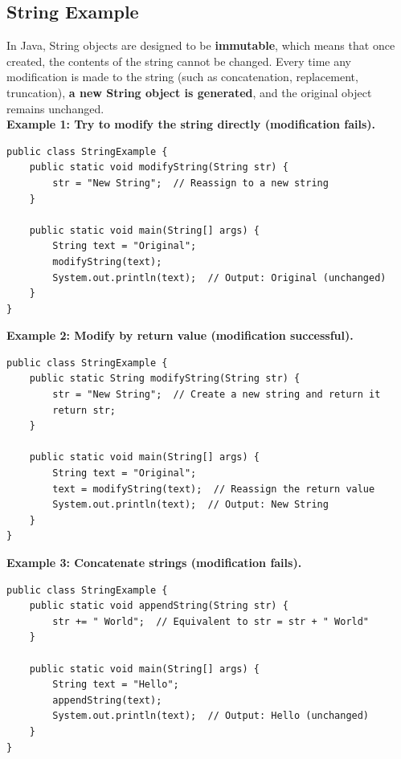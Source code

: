 \documentclass[letterpaper,12pt]{article}
\begin{document}
\subsection{String Example}
In Java, String objects are designed to be \textbf{immutable}, which means that once created, the contents of the string cannot be changed. Every time any modification is made to the string (such as concatenation, replacement, truncation), \textbf{a new String object is generated}, and the original object remains unchanged.\\
\textbf{Example 1: Try to modify the string directly (modification fails).}
\begin{verbatim}
public class StringExample {
    public static void modifyString(String str) {
        str = "New String";  // Reassign to a new string
    }

    public static void main(String[] args) {
        String text = "Original";
        modifyString(text);
        System.out.println(text);  // Output: Original (unchanged)
    }
}
\end{verbatim}
\textbf{Example 2: Modify by return value (modification successful).}
\begin{verbatim}
public class StringExample {
    public static String modifyString(String str) {
        str = "New String";  // Create a new string and return it
        return str;
    }

    public static void main(String[] args) {
        String text = "Original";
        text = modifyString(text);  // Reassign the return value
        System.out.println(text);  // Output: New String
    }
}
\end{verbatim}
\textbf{Example 3: Concatenate strings (modification fails).}
\begin{verbatim}
public class StringExample {
    public static void appendString(String str) {
        str += " World";  // Equivalent to str = str + " World"
    }

    public static void main(String[] args) {
        String text = "Hello";
        appendString(text);
        System.out.println(text);  // Output: Hello (unchanged)
    }
}
\end{verbatim}
\end{document}

